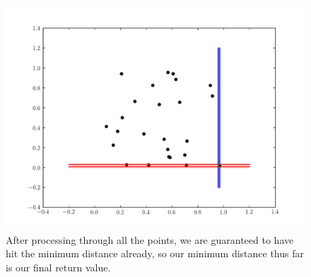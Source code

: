 \begin{figure}[H]
\includegraphics[width = .8\textwidth]{sweep22.pdf}
\caption{After processing through all the points, we are guaranteed to have hit the minimum distance already, so our minimum distance thus far is our final return value.}
\end{figure}

